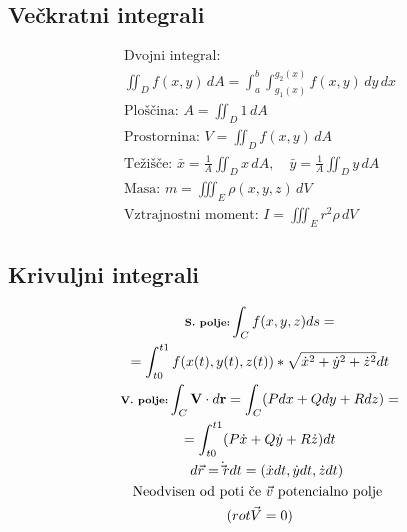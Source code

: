 \documentclass[a4paper,fleqn]{article} %
\begin{document}
\subsection*{Večkratni integrali}
\begin{gather*}
    \text{Dvojni integral: } \\ \iint_D f(x,y) \, dA = \int_a^b \int_{g_1(x)}^{g_2(x)} f(x,y) \, dy \, dx\\
    \text{Ploščina: } A = \iint_D 1 \, dA\\
    \text{Prostornina: } V = \iint_D f(x,y) \, dA\\
    \text{Težišče: } \bar{x} = \frac{1}{A}\iint_D x \, dA, \quad \bar{y} = \frac{1}{A}\iint_D y \, dA\\
    \text{Masa: } m = \iiint_E \rho(x,y,z) \, dV\\
    \text{Vztrajnostni moment: } I = \iiint_E r^2 \rho \, dV
\end{gather*}

\subsection*{Krivuljni integrali}
\begin{gather*}
    \textbf{\scriptsize S. polje:} 
    \int_C f(x,y,z) ds =\\=\int_{t0}^{t1} f(x(t),y(t),z(t))*\sqrt{\dot{x}^2+\dot{y}^2+\dot{z}^2} dt \\
    \textbf{\scriptsize V. polje:}
    \int_C \mathbf{V} \cdot d\mathbf{r} = \int_C(Pdx + Qdy + Rdz)= \\ =\int_{t0}^{t1}(P\dot{x}+Q\dot{y}+R\dot{z}) dt \\
    \quad d\vec{r} = \dot\vec{r} dt = (\dot{x}dt,\dot{y}dt,\dot{z}dt)\\
    \text{Neodvisen od poti če }\vec{v}\text{ potencialno polje } \\ (rot\vec{V}=0) 
\end{gather*}
\end{document}
